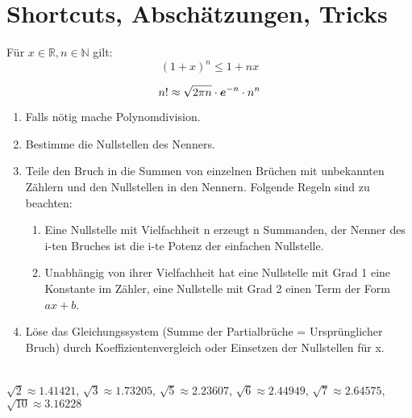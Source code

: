 \section{Shortcuts, Abschätzungen, Tricks}
	\begin{theorem}[Bernoulli]
		Für $x \in \mathbb{R}, n \in \mathbb{N}$ gilt:
		$$
		(1 + x)^n \leq 1 + nx
		$$
	\end{theorem}
	\begin{theorem}[Stirling]
		$$ n! \approx \sqrt{2 \pi n} \cdot \boldsymbol{e} ^{-n} \cdot n^n $$
	\end{theorem}
	\begin{proofhelp}[Partialbruchzerlegung]
		\hfill 
		\begin{enumerate}
			\item Falls nötig mache Polynomdivision.
			\item Bestimme die Nullstellen des Nenners.
			\item Teile den Bruch in die Summen von einzelnen Brüchen mit unbekannten Zählern und den Nullstellen in den Nennern. Folgende Regeln sind zu beachten:
			\begin{enumerate}
				\item Eine Nullstelle mit Vielfachheit n erzeugt n Summanden, der Nenner des i-ten Bruches ist die i-te Potenz der einfachen Nullstelle.
				\item Unabhängig von ihrer Vielfachheit hat eine Nullstelle mit Grad 1 eine Konstante im Zähler, eine Nullstelle mit Grad 2 einen Term der Form $ax + b$.
			\end{enumerate}
			\item Löse das Gleichungssystem (Summe der Partialbrüche = Ursprünglicher Bruch) durch Koeffizientenvergleich oder Einsetzen der Nullstellen für x.
		\end{enumerate}
	\end{proofhelp}
	\begin{shortcut} \hfill \\
		$\sqrt{2} \approx 1.41421 $, $\sqrt{3} \approx 1.73205 $, $\sqrt{5} \approx 2.23607 $, $ \sqrt{6} \approx 2.44949 $, $ \sqrt{7} \approx 2.64575 $, $\sqrt{10} \approx 3.16228 $
	\end{shortcut}
	

